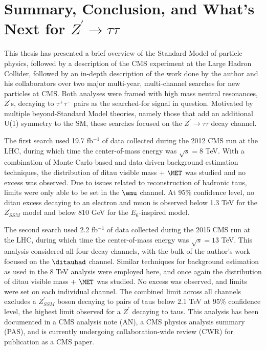 \chapter{Summary, Conclusion, and What's Next for $Z^\prime\to\tau\tau$}

This thesis has presented a brief overview of the Standard Model of particle physics, followed by a description of the CMS experiment at the Large Hadron Collider, followed by an in-depth description of the work done by the author and his collaborators over two major multi-year, multi-channel searches for new particles at CMS. Both analyses were framed with high mass neutral resonances, $Z^\prime$s, decaying to $\tau^+\tau^-$ pairs as the searched-for signal in question. Motivated by multiple beyond-Standard Model theories, namely those that add an additional U(1) symmetry to the SM, these searches focused on the $Z^\prime\to\tau\tau$ decay channel. 

The first search used 19.7 fb$^{-1}$ of data collected during the 2012 CMS run at the LHC, during which time the center-of-mass energy was $\sqrt{s} = 8$ TeV. With a combination of Monte Carlo-based and data driven background estimation techniques, the distribution of ditau visible mass + $\MET$ was studied and no excess was observed. Due to issues related to reconstruction of hadronic taus, limits were only able to be set in the $\emu$ channel. At 95\% confidence level, no ditau excess decaying to an electron and muon is observed below 1.3 TeV for the $Z^\prime_{SSM}$ model and below 810 GeV for the $E_6$-inspired model.

The second search used 2.2 fb$^{-1}$ of data collected during the 2015 CMS run at the LHC, during which time the center-of-mass energy was $\sqrt{s} = 13$ TeV. This analysis considered all four decay channels, with the bulk of the author's work focused on the $\ditauhad$ channel. Similar techniques for background estimation as used in the 8 TeV analysis were employed here, and once again the distribution of ditau visible mass + $\MET$ was studied. No excess was observed, and limits were set on each individual channel. The combined limit across all channels excludes a $Z^\prime_{SSM}$ boson decaying to pairs of taus below 2.1 TeV at 95\% confidence level, the highest limit observed for a $Z^\prime$ decaying to taus. This analysis has been documented in a CMS analysis note (AN), a CMS physics analysis summary (PAS), and is currently undergoing collaboration-wide review (CWR) for publication as a CMS paper.

